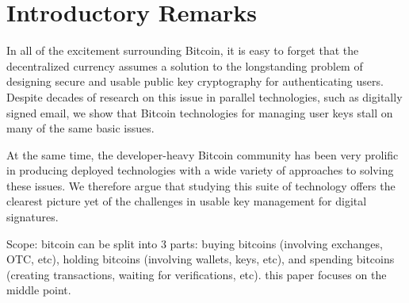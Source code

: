 
\section{Introductory Remarks}



In all of the excitement surrounding Bitcoin, it is easy to forget that the decentralized currency assumes a solution to the longstanding problem of designing secure and usable public key cryptography for authenticating users. Despite decades of research on this issue in parallel technologies, such as digitally signed email, we show that Bitcoin technologies for managing user keys stall on many of the same basic issues. 

At the same time, the developer-heavy Bitcoin community has been very prolific in producing deployed technologies with a wide variety of approaches to solving these issues. We therefore argue that studying this suite of technology offers the clearest picture yet of the challenges in usable key management for digital signatures. 



Scope: bitcoin can be split into 3 parts: buying bitcoins (involving exchanges, OTC, etc), holding bitcoins (involving wallets, keys, etc), and spending bitcoins (creating transactions, waiting for verifications, etc). this paper focuses on the middle point. 
